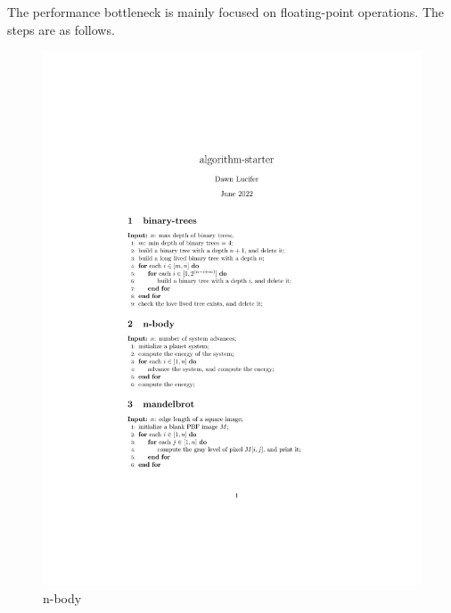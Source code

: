 The performance bottleneck is mainly focused on floating-point operations. The steps are as follows.

\begin{figure}[htbp]
    \centerline{\includegraphics[scale=0.8]{figures/n-body}}
    \caption{n-body}
    \label{fig:n-body}
\end{figure}

